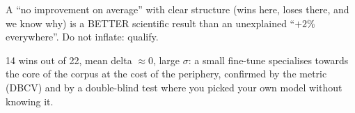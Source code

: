 \documentclass[11pt,a4paper]{article}
\begin{document}
\begin{ojo}
A ``no improvement on average'' with clear structure (wins here, loses there, and we know why)
is a BETTER scientific result than an unexplained ``$+2\%$ everywhere''. Do not inflate:
qualify.
\end{ojo}

\begin{resumen}
14 wins out of 22, mean delta $\approx 0$, large $\sigma$: a small fine-tune specialises
towards the core of the corpus at the cost of the periphery, confirmed by the metric (DBCV) and
by a double-blind test where you picked your own model without knowing it.
\end{resumen}
\end{document}
